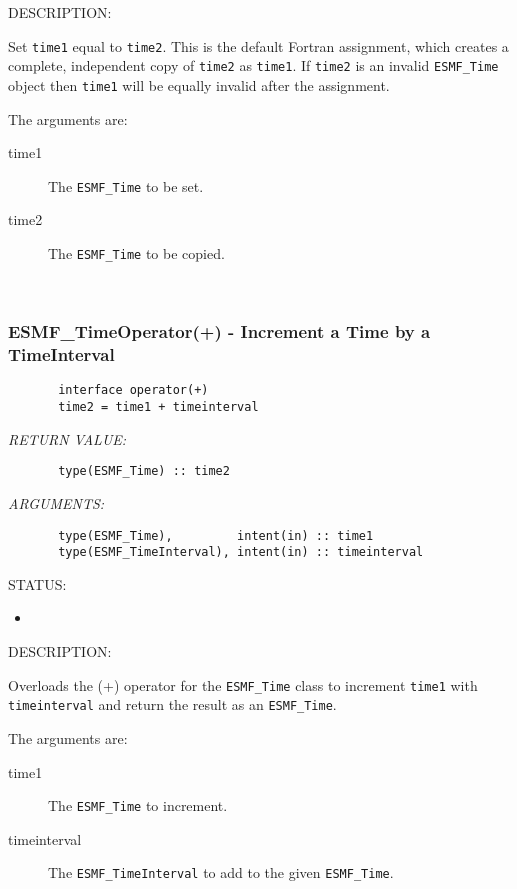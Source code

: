 {\sf DESCRIPTION:\\ }


       Set {\tt time1} equal to {\tt time2}.  This is the default Fortran
       assignment, which creates a complete, independent copy of {\tt time2} 
       as {\tt time1}.  If {\tt time2} is an invalid {\tt ESMF\_Time} object then
       {\tt time1} will be equally invalid after the assignment.
  
       The arguments are:
       \begin{description} 
       \item[time1] 
            The {\tt ESMF\_Time} to be set.
       \item[time2] 
            The {\tt ESMF\_Time} to be copied.
       \end{description}
   
 
\mbox{}\hrulefill\ 
 
\subsubsection [ESMF\_TimeOperator(+)] {ESMF\_TimeOperator(+) - Increment a Time by a TimeInterval}


  
\begin{verbatim}       interface operator(+)
       time2 = time1 + timeinterval      \end{verbatim}{\em RETURN VALUE:}
\begin{verbatim}       type(ESMF_Time) :: time2\end{verbatim}{\em ARGUMENTS:}
\begin{verbatim}       type(ESMF_Time),         intent(in) :: time1
       type(ESMF_TimeInterval), intent(in) :: timeinterval
   \end{verbatim}
{\sf STATUS:}
   \begin{itemize}
   \item{}
   \end{itemize}
  
{\sf DESCRIPTION:\\ }


       Overloads the (+) operator for the {\tt ESMF\_Time} class to increment
       {\tt time1} with {\tt timeinterval} and return the result as an
       {\tt ESMF\_Time}.
  
       The arguments are:
       \begin{description} 
       \item[time1] 
            The {\tt ESMF\_Time} to increment.
       \item[timeinterval] 
            The {\tt ESMF\_TimeInterval} to add to the given {\tt ESMF\_Time}.
       \end{description}
   
